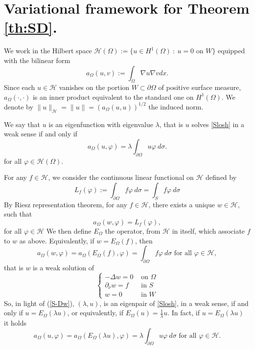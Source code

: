 \documentclass[a4paper,reqno,11pt,oneside]{amsart}
\theoremstyle{plain}
\theoremstyle{plain}
\theoremstyle{plain}
\theoremstyle{remark}
\begin{document}
\section{Variational framework for Theorem  \ref{th:SD}.}\label{Sec:frame}
We work in the Hilbert space $\mathcal{H}(\Omega):=\{u\in H^1(\Omega)\ :\ u=0 \text{ on }W\}$ equipped with the bilinear form $$a_\Omega(u,v):=\int_\Omega \nabla u \nabla v dx.$$
Since each $u\in \mathcal{H}$ vanishes on the portion $W\subset \partial \Omega$ of  positive surface measure, $a_\Omega(\cdot,\cdot)$ is an inner product equivalent to the standard one on $H^1(\Omega)$. We denote by $\|u\|_\mathcal{H} =\|u\|=(a_\Omega(u,u))^{1/2}$ the induced norm.

We say that $u$ is an eigenfunction with eigenvalue $\lambda$, that is $u$ solves \eqref{Slosh}  in a weak sense if and only if 
$$
    a_{\Omega}(u,\varphi)=\lambda\int_{\partial \Omega} u\varphi\ d\sigma .
$$
for all $\varphi\in \mathcal{H}(\Omega)$.

For any $f\in \mathcal{H}$, we consider the continuous linear functional on $\mathcal{H}$ defined by
$$
L_f(\varphi):=\int_{\partial\Omega} f\varphi\  d\sigma=\int_{S} f\varphi\  d\sigma
$$
By Riesz representation theorem, for any $f\in \mathcal{H}$, there exists a unique $w\in\mathcal{H}$, such that 
\[
a_{\Omega}(w,\varphi)=L_f (\varphi) ,
\]for all $\varphi\in \mathcal{H}$
We then define $E_\Omega$  the operator, from $ \mathcal{H}$ in itself, which associate $f$ to $w$ as above. Equivalently, if $w=E_\Omega (f)$, then 
\begin{equation}\label{eq:EuSD}
 a_{\Omega}(w,\varphi)=a_{\Omega}(E_\Omega(f),\varphi)=\int_{\partial \Omega} f\varphi\  d\sigma 
\text{ for all }\varphi \in \mathcal{H},
\end{equation}
 that is $w$ is a weak solution of  
\begin{equation}\label{S-Dw}
   \left\{
    \begin{array}{cc}
         -\Delta w=0& \text{ on } \Omega\\
        \partial_\nu w=f & \text{ in } S\\
        w=0 & \text{ in }  W
    \end{array}
    \right.
\end{equation}
So, in light of (\ref{S-Dw}),  $(\lambda, u)$, is an eigenpair of \eqref{Slosh}, in a weak sense, if and only if $u=E_\Omega(\lambda u)$, or equivalently, if $E_\Omega (u)=\frac 1\lambda u$.  In fact, if  $u=E_\Omega(\lambda u)$ it holds
\begin{equation}\label{identita}
     a_{\Omega}(u,\varphi)=a_{\Omega}(E_\Omega(\lambda u),\varphi)=\lambda\int_{\partial \Omega} u\varphi\  d\sigma 
\text{ for all }\varphi \in \mathcal{H}.
\end{equation}
\end{document}
